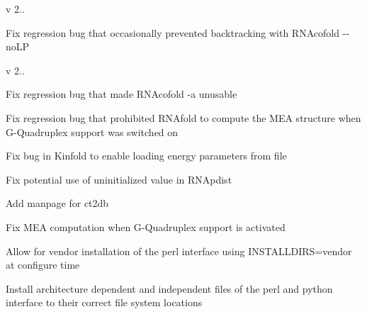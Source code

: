 v 2..
\begin{DoxyItemize}
\item Fix regression bug that occasionally prevented backtracking with R\+N\+Acofold -\/-\/no\+LP
\end{DoxyItemize}

v 2..
\begin{DoxyItemize}
\item Fix regression bug that made R\+N\+Acofold -\/a unusable
\item Fix regression bug that prohibited R\+N\+Afold to compute the M\+EA structure when G-\/\+Quadruplex support was switched on
\item Fix bug in Kinfold to enable loading energy parameters from file
\item Fix potential use of uninitialized value in R\+N\+Apdist
\item Add manpage for ct2db
\item Fix M\+EA computation when G-\/\+Quadruplex support is activated
\item Allow for vendor installation of the perl interface using I\+N\+S\+T\+A\+L\+L\+D\+I\+RS=vendor at configure time
\item Install architecture dependent and independent files of the perl and python interface to their correct file system locations
\end{DoxyItemize}

